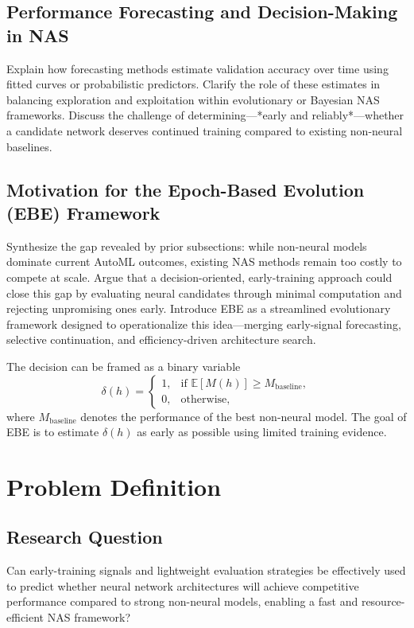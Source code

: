 \documentclass[stu,12pt,floatsintext,doublespacing]{apa7}
\begin{document}
\subsection{Performance Forecasting and Decision-Making in NAS}
Explain how forecasting methods estimate validation accuracy over time using fitted curves or probabilistic predictors. 
Clarify the role of these estimates in balancing exploration and exploitation within evolutionary or Bayesian NAS frameworks. 
Discuss the challenge of determining—*early and reliably*—whether a candidate network deserves continued training compared to existing non-neural baselines.

\subsection{Motivation for the Epoch-Based Evolution (EBE) Framework}
Synthesize the gap revealed by prior subsections: while non-neural models dominate current AutoML outcomes, existing NAS methods remain too costly to compete at scale. 
Argue that a decision-oriented, early-training approach could close this gap by evaluating neural candidates through minimal computation and rejecting unpromising ones early. 
Introduce EBE as a streamlined evolutionary framework designed to operationalize this idea—merging early-signal forecasting, selective continuation, and efficiency-driven architecture search.

The decision can be framed as a binary variable
\begin{equation}
\delta(h) =
\begin{cases}
1, & \text{if } \mathbb{E}[M(h)] \geq M_{\text{baseline}},\\[4pt]
0, & \text{otherwise,}
\end{cases}
\end{equation}
where $M_{\text{baseline}}$ denotes the performance of the best non-neural model.
The goal of EBE is to estimate $\delta(h)$ as early as possible using limited training evidence.


\section{Problem Definition}
\subsection{Research Question}
Can early-training signals and lightweight evaluation strategies be effectively used to predict whether neural network architectures will achieve competitive performance compared to strong non-neural models, enabling a fast and resource-efficient NAS framework?
\end{document}
